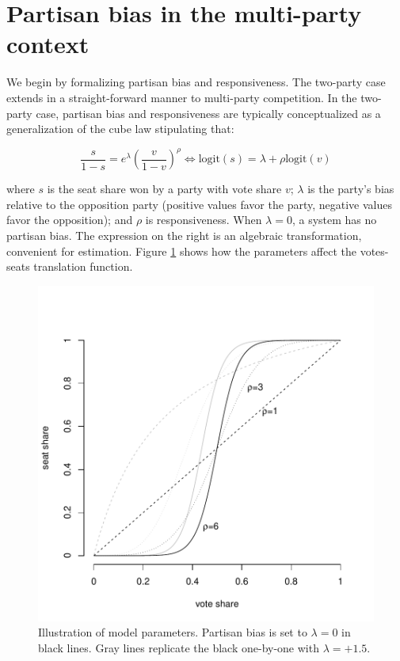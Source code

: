 \documentclass[letter,12pt]{article}
\begin{document}
\section{Partisan bias in the multi-party context}

We begin by formalizing partisan bias and responsiveness. The two-party case \citep{taagepera.CubeLaw.1973,tufte1973seatsVotes,king.browning1987biasRespUS} extends in a straight-forward manner to multi-party competition. In the two-party case, partisan bias and responsiveness are typically conceptualized as a generalization of the cube law stipulating that:

\begin{equation}\label{E:kingBi}
 \frac{s}{1-s} = e^\lambda  \left(\frac{v}{1-v}\right)^\rho \iff
 \text{logit}(s) = \lambda + \rho  \text{logit}(v)
\end{equation}\label{E:cubeLaw}

\noindent where $s$ is the seat share won by a party with vote share $v$; $\lambda$ is the party's bias relative to the opposition party (positive values favor the party, negative values favor the opposition); and $\rho$ is responsiveness. When $\lambda=0$, a system has no partisan bias. The expression on the right is an algebraic transformation, convenient for estimation. Figure \ref{F:lambdaRhoEx} shows how the parameters affect the votes-seats translation function. 


\begin{figure}
\begin{center}
    \includegraphics[width=.55\columnwidth]{rhoExample.pdf} 
\caption{Illustration of model parameters. Partisan bias is set to $\lambda=0$ in black lines. Gray lines replicate the black one-by-one with $\lambda=+1.5$.}\label{F:lambdaRhoEx}
\end{center}
\end{figure}
\end{document}
